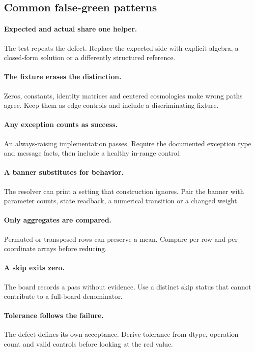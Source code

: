 \subsection{Common false-green patterns}

\paragraph{Expected and actual share one helper.}
The test repeats the defect.  Replace the expected side with explicit algebra,
a closed-form solution or a differently structured reference.

\paragraph{The fixture erases the distinction.}
Zeros, constants, identity matrices and centered cosmologies make wrong paths
agree.  Keep them as edge controls and include a discriminating fixture.

\paragraph{Any exception counts as success.}
An always-raising implementation passes.  Require the documented exception
type and message facts, then include a healthy in-range control.

\paragraph{A banner substitutes for behavior.}
The resolver can print a setting that construction ignores.  Pair the banner
with parameter counts, state readback, a numerical transition or a changed
weight.

\paragraph{Only aggregates are compared.}
Permuted or transposed rows can preserve a mean.  Compare per-row and
per-coordinate arrays before reducing.

\paragraph{A skip exits zero.}
The board records a pass without evidence.  Use a distinct skip status that
cannot contribute to a full-board denominator.

\paragraph{Tolerance follows the failure.}
The defect defines its own acceptance.  Derive tolerance from dtype,
operation count and valid controls before looking at the red value.


